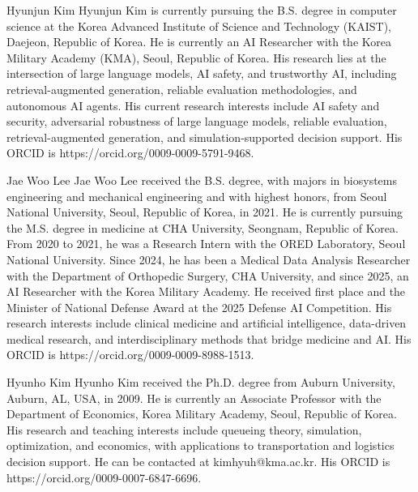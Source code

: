 \documentclass{ieeeaccess}
\begin{document}
\begin{IEEEbiographynophoto}{Hyunjun Kim}
Hyunjun Kim is currently pursuing the B.S. degree in computer science at the Korea Advanced Institute of Science and Technology (KAIST), Daejeon, Republic of Korea. He is currently an AI Researcher with the Korea Military Academy (KMA), Seoul, Republic of Korea. His research lies at the intersection of large language models, AI safety, and trustworthy AI, including retrieval-augmented generation, reliable evaluation methodologies, and autonomous AI agents. His current research interests include AI safety and security, adversarial robustness of large language models, reliable evaluation, retrieval-augmented generation, and simulation-supported decision support. His ORCID is https://orcid.org/0009-0009-5791-9468.
\end{IEEEbiographynophoto}

\begin{IEEEbiographynophoto}{Jae Woo Lee}
Jae Woo Lee received the B.S. degree, with majors in biosystems engineering and mechanical engineering and with highest honors, from Seoul National University, Seoul, Republic of Korea, in 2021. He is currently pursuing the M.S. degree in medicine at CHA University, Seongnam, Republic of Korea. From 2020 to 2021, he was a Research Intern with the ORED Laboratory, Seoul National University. Since 2024, he has been a Medical Data Analysis Researcher with the Department of Orthopedic Surgery, CHA University, and since 2025, an AI Researcher with the Korea Military Academy. He received first place and the Minister of National Defense Award at the 2025 Defense AI Competition. His research interests include clinical medicine and artificial intelligence, data-driven medical research, and interdisciplinary methods that bridge medicine and AI. His ORCID is https://orcid.org/0009-0009-8988-1513.
\end{IEEEbiographynophoto}

\begin{IEEEbiographynophoto}{Hyunho Kim}
Hyunho Kim received the Ph.D. degree from Auburn University, Auburn, AL, USA, in 2009. He is currently an Associate Professor with the Department of Economics, Korea Military Academy, Seoul, Republic of Korea. His research and teaching interests include queueing theory, simulation, optimization, and economics, with applications to transportation and logistics decision support. He can be contacted at kimhyuh@kma.ac.kr. His ORCID is https://orcid.org/0009-0007-6847-6696.
\end{IEEEbiographynophoto}

\EOD
\end{document}
